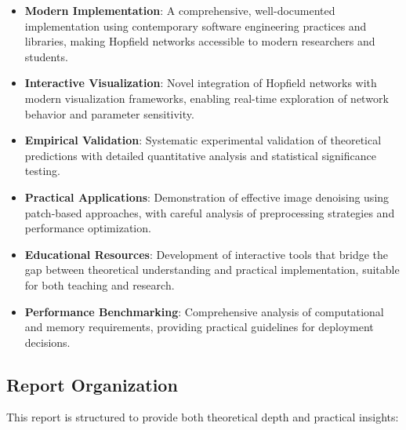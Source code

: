 \documentclass[11pt,a4paper]{article}
\begin{document}
\begin{itemize}
    \item \textbf{Modern Implementation}: A comprehensive, well-documented implementation using contemporary software engineering practices and libraries, making Hopfield networks accessible to modern researchers and students.
    
    \item \textbf{Interactive Visualization}: Novel integration of Hopfield networks with modern visualization frameworks, enabling real-time exploration of network behavior and parameter sensitivity.
    
    \item \textbf{Empirical Validation}: Systematic experimental validation of theoretical predictions with detailed quantitative analysis and statistical significance testing.
    
    \item \textbf{Practical Applications}: Demonstration of effective image denoising using patch-based approaches, with careful analysis of preprocessing strategies and performance optimization.
    
    \item \textbf{Educational Resources}: Development of interactive tools that bridge the gap between theoretical understanding and practical implementation, suitable for both teaching and research.
    
    \item \textbf{Performance Benchmarking}: Comprehensive analysis of computational and memory requirements, providing practical guidelines for deployment decisions.
\end{itemize}

\subsection{Report Organization}

This report is structured to provide both theoretical depth and practical insights:
\end{document}
